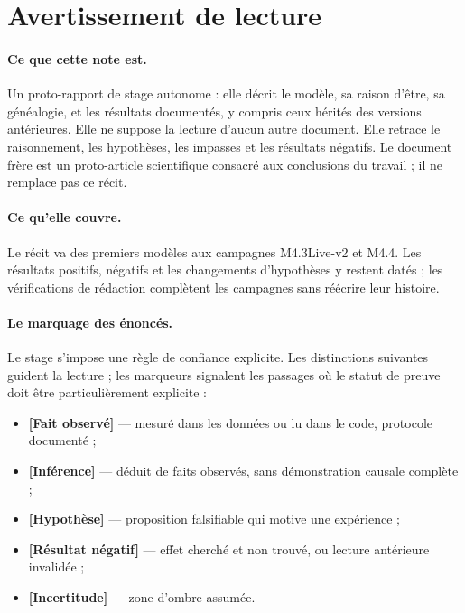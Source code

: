 \documentclass[11pt,a4paper]{article}
\newcommand{\chemin}[1]{\texttt{\path{#1}}}
\newcommand{\fait}{\textbf{[Fait observé]}}
\newcommand{\inference}{\textbf{[Inférence]}}
\newcommand{\hyp}{\textbf{[Hypothèse]}}
\newcommand{\negatif}{\textbf{[Résultat négatif]}}
\newcommand{\incertitude}{\textbf{[Incertitude]}}
\begin{document}
\tableofcontents
\clearpage

\section*{Avertissement de lecture}

\paragraph{Ce que cette note est.} Un proto-rapport de stage autonome : elle décrit
le modèle, sa raison d'être, sa généalogie, et les résultats documentés, y compris ceux hérités des versions antérieures. Elle ne suppose la
lecture d'aucun autre document. Elle retrace le raisonnement, les hypothèses,
les impasses et les résultats négatifs. Le document frère
\chemin{recherche/note_resultats/} est un proto-article scientifique consacré
aux conclusions du travail ; il ne remplace pas ce récit.

\paragraph{Ce qu'elle couvre.} Le récit va des premiers modèles aux
campagnes M4.3Live-v2 et M4.4. Les résultats positifs, négatifs et les
changements d'hypothèses y restent datés ; les vérifications de rédaction
complètent les campagnes sans réécrire leur histoire.

\paragraph{Le marquage des énoncés.} Le stage s'impose une règle de confiance
explicite. Les distinctions suivantes guident la lecture ; les marqueurs signalent
les passages où le statut de preuve doit être particulièrement explicite :

\begin{itemize}
\item \fait{} --- mesuré dans les données ou lu dans le code, protocole
      documenté ;
\item \inference{} --- déduit de faits observés, sans démonstration causale
      complète ;
\item \hyp{} --- proposition falsifiable qui motive une expérience ;
\item \negatif{} --- effet cherché et non trouvé, ou lecture antérieure
      invalidée ;
\item \incertitude{} --- zone d'ombre assumée.
\end{itemize}
\end{document}
